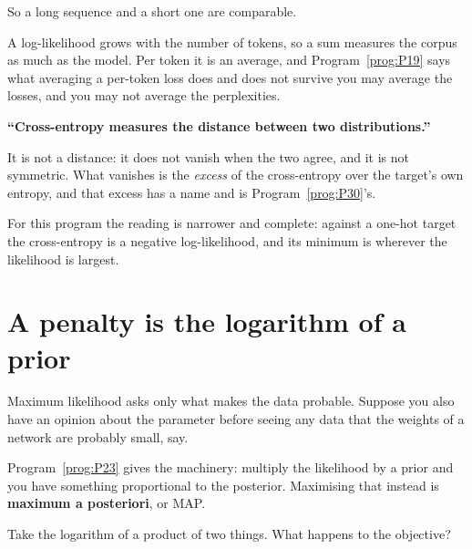 \begin{fr}
\begin{ansblock}
So a long sequence and a short one are comparable.
\end{ansblock}

A log-likelihood grows with the number of tokens, so a sum measures the
corpus as much as the model. Per token it is an average, and
Program~\ref{prog:P19} says what averaging a per-token loss does and does not
survive \dash{} you may average the losses, and you may not average the
perplexities.

\begin{trapbox}
\textbf{\enquote{Cross-entropy measures the distance between two
distributions.}}

It is not a distance: it does not vanish when the two agree, and it is not
symmetric. What vanishes is the \emph{excess} of the cross-entropy over the
target's own entropy, and that excess has a name and is
Program~\ref{prog:P30}'s.

For this program the reading is narrower and complete: against a one-hot
target the cross-entropy is a negative log-likelihood, and its minimum is
wherever the likelihood is largest.
\end{trapbox}
\end{fr}

\section{A penalty is the logarithm of a prior}
\label{sec:P26-prior}

\begin{fr}
Maximum likelihood asks only what makes the data probable. Suppose you also
have an opinion about the parameter before seeing any data \dash{} that the
weights of a network are probably small, say.

Program~\ref{prog:P23} gives the machinery: multiply the likelihood by a
prior and you have something proportional to the posterior. Maximising that
instead is \textbf{maximum a posteriori}, or MAP.

Take the logarithm of a product of two things. What happens to the objective?
\dotline
\nextframe
\end{fr}

